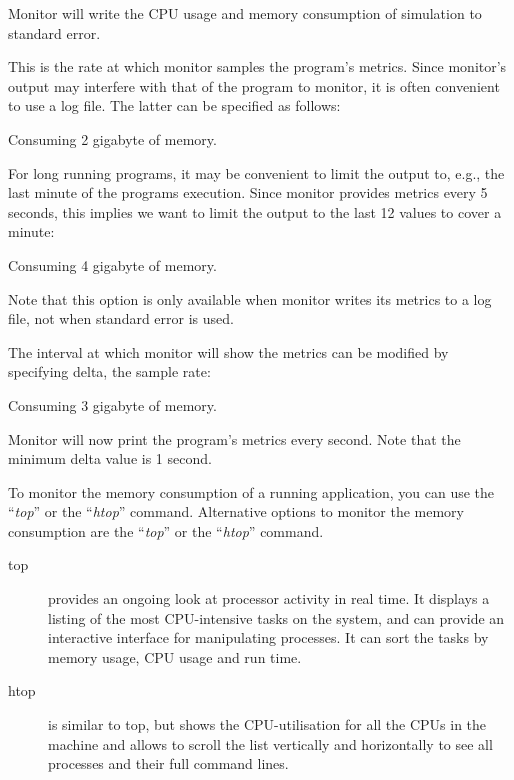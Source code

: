 Monitor will write the CPU usage and memory consumption of simulation to standard error.

This is the rate at which monitor samples the program's metrics. Since
monitor's output may interfere with that of the program to monitor, it is often
convenient to use a log file. The latter can be specified as follows:

\begin{prompt}
Consuming 2 gigabyte of memory.
\end{prompt}

For long running programs, it may be convenient to limit the output to, e.g.,
the last minute of the programs execution. Since monitor provides metrics every
5 seconds, this implies we want to limit the output to the last 12 values to
cover a minute:

\begin{prompt}
Consuming 4 gigabyte of memory.
\end{prompt}

Note that this option is only available when monitor writes its metrics to a
log file, not when standard error is used.

The interval at which monitor will show the metrics can be modified by
specifying delta, the sample rate:

\begin{prompt}
Consuming 3 gigabyte of memory.
\end{prompt}

Monitor will now print the program's metrics every second. Note that the
minimum delta value is 1 second.
\fi

\ifgent
To monitor the memory consumption of a running application, you can use the ``\emph{top}''
or the ``\emph{htop}'' command.
\else
  Alternative options to monitor the memory consumption are the ``\emph{top}''
  or the ``\emph{htop}'' command.
\fi

\begin{description}
  \item[top] provides an ongoing look at processor activity in real time. It displays a listing of the most CPU-intensive tasks on the system, and can provide an interactive interface for manipulating processes. It can sort the tasks by memory usage, CPU usage and run time.
  \item[htop] is similar to top, but shows the CPU-utilisation for all the CPUs in the machine and allows to scroll the list vertically and horizontally to see all processes and their full command lines.
\end{description}

